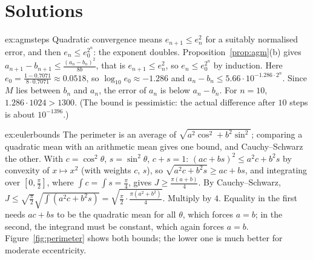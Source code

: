 \section{Solutions}

\begin{solution}{ex:agmsteps}
\idea Quadratic convergence means $e_{n+1}\le e_n^2$ for a suitably normalised error, and then $e_n\le e_0^{2^n}$: the exponent doubles.
\writeup Proposition~\ref{prop:agm}(b) gives $a_{n+1}-b_{n+1}\le\frac{(a_n-b_n)^2}{8b}$, that is $e_{n+1}\le e_n^2$, so $e_n\le e_0^{2^n}$ by induction. Here
$e_0=\frac{1-0.7071}{8\cdot0.7071}\approx0.0518$, so $\log_{10}e_0\approx-1.286$ and $a_n-b_n\le5.66\cdot10^{-1.286\cdot2^n}$. Since $M$ lies between $b_n$ and $a_n$, the error of $a_n$
is below $a_n-b_n$. For $n=10$, $1.286\cdot1024>1300$. (The bound is pessimistic: the actual difference after $10$ steps is about $10^{-1396}$.)
\end{solution}

\begin{solution}{ex:eulerbounds}
\idea The perimeter is an average of $\sqrt{a^2\cos^2+b^2\sin^2}$; comparing a quadratic mean with an arithmetic mean gives one bound, and Cauchy--Schwarz the other.
\writeup With $c=\cos^2\theta$, $s=\sin^2\theta$, $c+s=1$: $(ac+bs)^2\le a^2c+b^2s$ by convexity of $x\mapsto x^2$ (with weights $c$, $s$), so
$\sqrt{a^2c+b^2s}\ge ac+bs$, and integrating over $[0,\frac\pi2]$, where $\int c=\int s=\frac\pi4$, gives $J\ge\frac{\pi(a+b)}4$. By Cauchy--Schwarz,
$J\le\sqrt{\frac\pi2}\sqrt{\int(a^2c+b^2s)}=\sqrt{\frac\pi2\cdot\frac{\pi(a^2+b^2)}4}$. Multiply by $4$. Equality in the first needs $ac+bs$ to be the quadratic mean for all
$\theta$, which forces $a=b$; in the second, the integrand must be constant, which again forces $a=b$. Figure~\ref{fig:perimeter} shows both bounds; the lower one is
much better for moderate eccentricity.
\end{solution}

